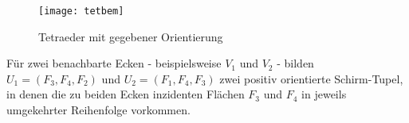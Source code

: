 \documentclass[12pt,titlepage,twoside,cleardoublepage]{article}
\theoremstyle{nummermitklammern}
\numberwithin{equation}{section}
\begin{document}
\begin{figure}[H]
\begin{center}
\texttt{[image: tetbem]}
\end{center}
\caption{Tetraeder mit gegebener Orientierung}
\end{figure} 
Für zwei benachbarte Ecken - beispielsweise $V_1$ und $V_2$ - bilden $U_1=(F_3,F_4,F_2)$ und $U_2=(F_1,F_4,F_3)$ zwei positiv orientierte Schirm-Tupel, in denen die zu beiden Ecken inzidenten Flächen $F_3$ und $F_4$ in jeweils umgekehrter Reihenfolge vorkommen.

\end{document}
